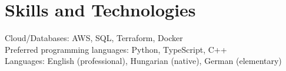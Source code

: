 \documentclass[a4paper,11pt]{article}
\begin{document}
\vspace{-5.5mm}


\section{Skills and Technologies}
\begin{itemize}[leftmargin=0.1in, label={}]
  \small{\item{
        Cloud/Databases{: AWS, SQL, Terraform, Docker} \\
        Preferred programming languages{: Python, TypeScript, C++} \\
        Languages{: English (professional), Hungarian (native), German (elementary)} \\
        }}
\end{itemize}
\vspace{-16pt}

\end{document}
